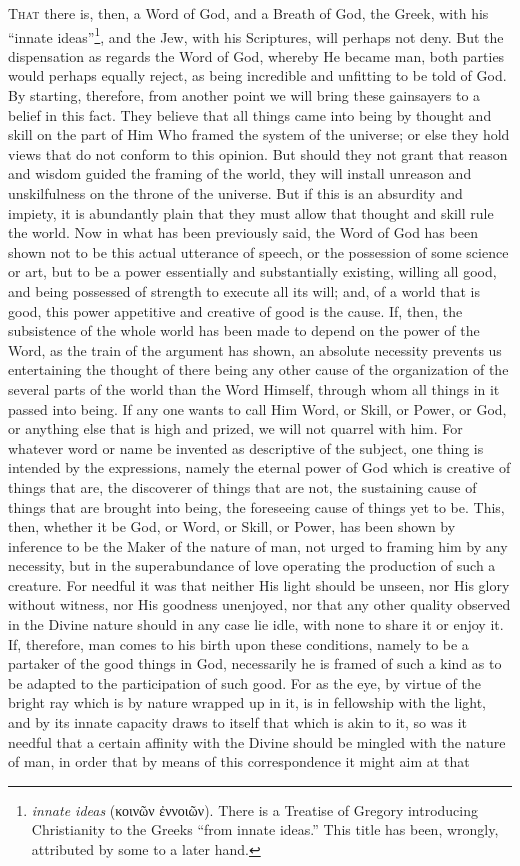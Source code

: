 \textsc{That} there is, then, a Word of God, and a Breath of God, the Greek, with his “innate ideas”\footnote{\emph{innate ideas} (\textgreek{κοινῶν ἐννοιῶν}). There is a Treatise of Gregory introducing Christianity to the Greeks “from innate ideas.” This title has been, wrongly, attributed by some to a later hand.}, and the Jew, with his Scriptures, will perhaps not deny. But the dispensation as regards the Word of God, whereby He became man, both parties would perhaps equally reject, as being incredible and unfitting to be told of God. By starting, therefore, from another point we will bring these gainsayers to a belief in this fact. They believe that all things came into being by thought and skill on the part of Him Who framed the system of the universe; or else they hold views that do not conform to this opinion. But should they not grant that reason and wisdom guided the framing of the world, they will install unreason and unskilfulness on the throne of the universe. But if this is an absurdity and impiety, it is abundantly plain that they must allow that thought and skill rule the world. Now in what has been previously said, the Word of God has been shown not to be this actual utterance of speech, or the possession of some science or art, but to be a power essentially and substantially existing, willing all good, and being possessed of strength to execute all its will; and, of a world that is good, this power appetitive and creative of good is the cause. If, then, the subsistence of the whole world has been made to depend on the power of the Word, as the train of the argument has shown, an absolute necessity prevents us entertaining the thought of there being any other cause of the organization of the several parts of the world than the Word Himself, through whom all things in it passed into being. If any one wants to call Him Word, or Skill, or Power, or God, or anything else that is high and prized, we will not quarrel with him. For whatever word or name be invented as descriptive of the subject, one thing is intended by the expressions, namely the eternal power of God which is creative of things that are, the discoverer of things that are not, the sustaining cause of things that are brought into being, the foreseeing cause of things yet to be. This, then, whether it be God, or Word, or Skill, or Power, has been shown by inference to be the Maker of the nature of man, not urged to framing him by any necessity, but in the superabundance of love operating the production of such a creature. For needful it was that neither His light should be unseen, nor His glory without witness, nor His goodness unenjoyed, nor that any other quality observed in the Divine nature should in any case lie idle, with none to share it or enjoy it. If, therefore, man comes to his birth upon these conditions, namely to be a partaker of the good things in God, necessarily he is framed of such a kind as to be adapted to the participation of such good. For as the eye, by virtue of the bright ray which is by nature wrapped up in it, is in fellowship with the light, and by its innate capacity draws to itself that which is akin to it, so was it needful that a certain affinity with the Divine should be mingled with the nature of man, in order that by means of this correspondence it might aim at that 